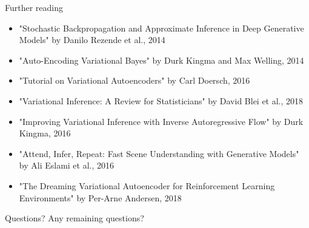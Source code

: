 \documentclass[10pt,aspectratio=169]{beamer}
\begin{document}
\begin{frame}{Further reading}
    \begin{itemize}
        \item "Stochastic Backpropagation and Approximate Inference in Deep Generative Models" by Danilo Rezende et al., 2014
        \item "Auto-Encoding Variational Bayes" by Durk Kingma and Max Welling, 2014
        \item "Tutorial on Variational Autoencoders" by Carl Doersch, 2016
        \item "Variational Inference: A Review for Statisticians" by David Blei et al., 2018
        \item "Improving Variational Inference with Inverse Autoregressive Flow" by Durk Kingma, 2016
        \item "Attend, Infer, Repeat: Fast Scene Understanding with Generative Models" by Ali Eslami et al., 2016
        \item "The Dreaming Variational Autoencoder for Reinforcement Learning Environments" by Per-Arne Andersen, 2018
    \end{itemize}
\end{frame}

\begin{frame}{Questions?}
    \center
    Any remaining questions?
\end{frame}

\appendix
\end{document}
